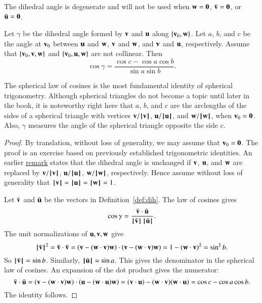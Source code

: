 The dihedral angle is degenerate and will not be used when $\w =
\orz$, $\bar \v = \orz$, or $\bar \u = \orz$.

\begin{lemma}\label{lemma:sloc}
    Let $\gamma$ be the
  dihedral angle formed by $\v$ and $\u$ along $\{\v_0,\w\}$.  Let
  $a$, $b$, and $c$ be the angle at $\v_0$ between $\u$ and $\w$, $\v$
  and $\w$, and $\v$ and $\u$, respectively. %
  Assume that $\{\v_0,\v,\w\}$ and $\{\v_0,\u,\w\}$ are not collinear.
  Then
  \begin{displaymath}\cos\gamma = \frac{\cos c - \cos a \cos b}{\sin
      a\sin b}.\end{displaymath}
\end{lemma}
%
%
%

The spherical law of cosines is the most fundamental identity of
spherical trigonometry.  Although spherical triangles do not become a
topic until later in the book, it is noteworthy right here that $a$,
$b$, and $c$ are the arclengths of the sides of a spherical triangle
with vertices $\v/\normo{\v}$, $\u/\normo{\u}$, and $\w/\normo{\w}$,
when $\v_0=\orz$.  Also, $\gamma$ measures the angle of the spherical
triangle opposite the side $c$.  %
%


\begin{proof} By translation, without loss of generality, we may
  assume that $\v_0=\orz$.  The proof is an exercise based on
  previously established trigonometric identities.  An earlier
  \hyperref[rem:dih]{remark} states that the dihedral angle is
  unchanged if $\v$, $\u$, and $\w$ are replaced by $\v/\normo{\v}$,
  $\u/\normo{\u}$, $\w/\normo{\w}$, respectively.  Hence assume
  without loss of generality that
  $\normo{\v}=\normo{\u}=\normo{\w}=1$.

Let $\bar \v$ and $\bar \u$ be the vectors in Definition~\ref{def:dih}.
The law of cosines gives
\begin{displaymath}\cos\gamma = \frac{\bar \v\cdot \bar \u}
{\normo{\bar \v}\,\normo{\bar \u}}.
\end{displaymath}
The unit normalizations of $\u,\v,\w$ give
\begin{displaymath}
\normo{\bar \v}^2 = \bar \v\cdot \bar \v =
(\v - (\w\cdot \v)\w)\cdot (\v - (\w\cdot \v) \w) =
1 - (\w\cdot \v)^2 = \sin^2 b.
\end{displaymath}
So $\normo{\bar \v} =\sin b$. Similarly, $\normo{\bar \u} = \sin a$.
This gives the denominator in the spherical law of cosines.  An
expansion of the dot product gives the numerator:
\begin{displaymath}
\bar \v\cdot \bar \u = (\v - (\w\cdot \v) \w)\cdot (\u - (\w\cdot \u) \w)
= (\v\cdot \u) - (\w\cdot \v) (\w\cdot \u) = \cos c - \cos
a \cos b.
\end{displaymath}
The identity follows.
\end{proof}

